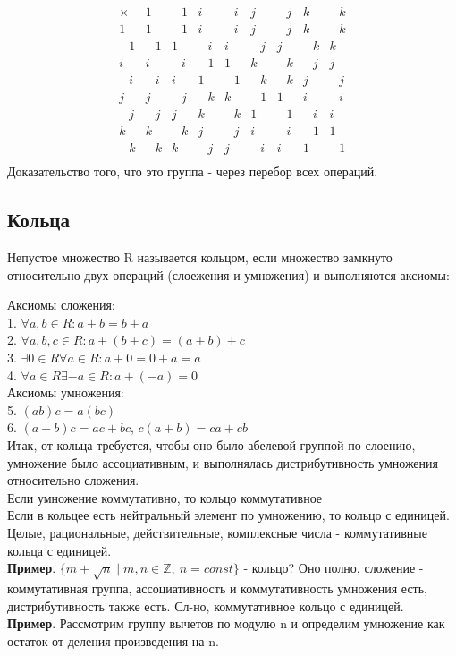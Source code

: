 $$\begin{matrix}\times&1&-1&i&-i&j&-j&k&-k\\
1&1&-1&i&-i&j&-j&k&-k\\
-1&-1&1&-i&i&-j&j&-k&k\\
i&i&-i&-1&1&k&-k&-j&j\\
-i&-i&i&1&-1&-k&-k&j&-j\\
j&j&-j&-k&k&-1&1&i&-i\\
-j&-j&j&k&-k&1&-1&-i&i\\
k&k&-k&j&-j&i&-i&-1&1\\
-k&-k&k&-j&j&-i&i&1&-1\\
\end{matrix}$$
Доказательство того, что это группа - через перебор всех операций. 
\subsection{Кольца}
\begin{defin}
Непустое множество R называется кольцом, если множество
замкнуто относительно двух операций (слоежения и умножения) и выполняются
аксиомы:\end{defin}
Аксиомы сложения:\\
1. $\forall a,b \in R : a+b=b+a$ \\
2. $\forall a,b,c \in R: a+(b+c)=(a+b)+c$\\
3. $\exists 0 \in R \forall a \in R: a+0=0+a=a$\\
4. $\forall a \in R \exists -a\in R: a+(-a)=0$\\
Аксиомы умножения:\\
5. $(ab)c=a(bc)$\\
6. $(a+b)c=ac+bc$, $c(a+b)=ca+cb$\\
Итак, от кольца требуется, чтобы оно было абелевой группой по слоению, 
умножение было ассоциативным, и выполнялась дистрибутивность умножения 
относительно сложения. \\
Если умножение коммутативно, то кольцо коммутативное\\
Если в кольцее есть нейтральный элемент по умножению, то кольцо с единицей.\\
Целые, рациональные, действительные, комплексные числа - коммутативные 
кольца с единицей. \\
\textbf{Пример}. $\{m+\sqrt{n}\mid m,n\in\mathbb Z,~n=const\}$ - кольцо?
Оно полно, сложение - коммутативная группа, ассоциативность и коммутативность
умножения есть, дистрибутивность также есть. Сл-но, коммутативное кольцо с
единицей.\\
\textbf{Пример}. Рассмотрим группу вычетов по модулю n и определим умножение 
как остаток от деления произведения на n. 

